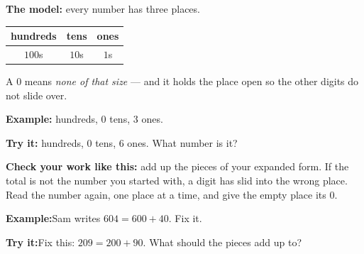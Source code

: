\documentclass[12pt]{article}
\begin{document}

\begin{formulabox}\textbf{The model:} every number has three places.\par
\begin{center}\small
\begin{tabular}{|c|c|c|}\hline
\textbf{hundreds} & \textbf{tens} & \textbf{ones} \\\hline
$100$s & $10$s & $1$s \\\hline
\end{tabular}
\end{center}
A $0$ means \emph{none of that size} --- and it holds the place open so the other
digits do not slide over.
\end{formulabox}
\begin{examplebox}\textbf{Example:} hundreds, 0 tens, 3 ones.
\end{examplebox}
\begin{tryitbox}\textbf{Try it:} hundreds, 0 tens, 6 ones. What number is it?\\[2pt]
\end{tryitbox}

\begin{formulabox}\textbf{Check your work like this:} add up the pieces of your
expanded form. If the total is not the number you started with, a digit has slid into
the wrong place. Read the number again, one place at a time, and give the empty place
its $0$.
\end{formulabox}
\begin{examplebox}\textbf{Example:}\quad Sam writes $604 = 600 + 40$. Fix it.
\end{examplebox}
\begin{tryitbox}\textbf{Try it:}\quad Fix this: $209 = 200 + 90$. What should the pieces add up to?\\[2pt]
\end{tryitbox}
\end{document}
